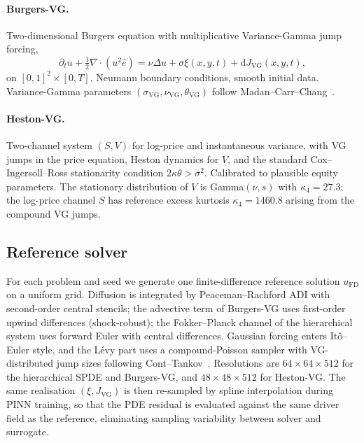 \documentclass[review,12pt]{elsarticle}
\begin{document}
\paragraph{Burgers-VG.}
Two-dimensional Burgers equation with multiplicative
Variance-Gamma jump forcing,
\begin{equation}
\partial_t u + \tfrac12 \nabla \cdot (u^2 \hat e)
= \nu \Delta u + \sigma \xi(x, y, t)
+ \mathrm dJ_{\mathrm{VG}}(x, y, t),
\label{eq:burgersvg}
\end{equation}
on \([0,1]^2 \times [0, T]\), Neumann boundary conditions, smooth
initial data. Variance-Gamma parameters
\((\sigma_{\mathrm{VG}}, \nu_{\mathrm{VG}}, \theta_{\mathrm{VG}})\)
follow Madan--Carr--Chang~\cite{MadanCarrChang1998}.

\paragraph{Heston-VG.}
Two-channel system \((S, V)\) for log-price and instantaneous
variance, with VG jumps in the price equation, Heston dynamics for
\(V\), and the standard Cox--Ingersoll--Ross stationarity
condition \(2\kappa\theta > \sigma^2\). Calibrated to plausible
equity parameters. The stationary distribution of \(V\) is
Gamma\((\nu, s)\) with \(\kappa_4 = 27.3\); the log-price channel
\(S\) has reference excess kurtosis \(\kappa_4 = 1460.8\) arising
from the compound VG jumps.

\subsection{Reference solver}

For each problem and seed we generate one finite-difference
reference solution \(u_{\mathrm{FD}}\) on a uniform grid. Diffusion
is integrated by Peaceman--Rachford ADI with second-order central
stencils; the advective term of Burgers-VG uses first-order upwind
differences (shock-robust); the Fokker--Planck channel of the
hierarchical system uses forward Euler with central differences.
Gaussian forcing enters It\^o--Euler style, and the L\'evy part uses
a compound-Poisson sampler with VG-distributed jump sizes following
Cont--Tankov~\cite{ContTankov2003}.
Resolutions are \(64\times 64 \times 512\) for the hierarchical
SPDE and Burgers-VG, and \(48\times 48 \times 512\) for
Heston-VG. The same realisation \((\xi, J_{\mathrm{VG}})\) is then
re-sampled by spline interpolation during PINN training, so that
the PDE residual is evaluated against the same driver field as
the reference, eliminating sampling variability between solver and
surrogate.
\end{document}
